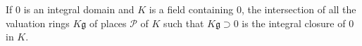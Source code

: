 If $\mathfrak{0}$ is an integral domain and $K$ is a field containing $\mathfrak{0}$, the intersection of all the valuation rings $K\mathfrak{g}$ of places $\mathcal{P}$ of $K$ such that $K\mathfrak{g} \supset \mathfrak{0}$ is the integral closure of $\mathfrak{0}$ in $K$.